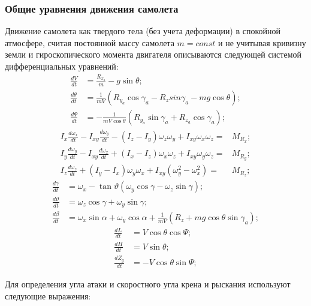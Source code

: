 \documentclass{article}
\begin{document}
\subsubsection{Общие уравнения движения самолета}
Движение самолета как твердого тела (без учета деформации) в спокойной
атмосфере, считая постоянной массу самолета $m=const$ и не учитывая кривизну
земли и гироскопического момента двигателя описываются следующей системой
дифференциальных уравнений:
\begin{align*}
    \frac{dV}{dt}      & = \frac{R_{x_a}}{m} - g \sin{\theta};
    \\
    \frac{d\theta}{dt} & = \frac{1}{mV}(R_{y_a} \cos{\gamma_a} - R_{z}
    sin{\gamma_a} - mg \cos{\theta}); \\
    \frac{d\Psi}{dt}   & = -\frac{1}{mV \cos{\theta}} (R_{y_a} \sin{\gamma_a} +
    R_{z_a} \cos{\gamma_a});
\end{align*}
\begin{align*}
    I_x \frac{d\omega_x}{dt} - I_{xy} \frac{d\omega_y}{dt} - (I_z - I_y)
    \omega_z \omega_y + I_{xy} \omega_x \omega_z = & M_{R_x}; \\
    I_y \frac{d\omega_y}{dt} - I_{xy} \frac{d\omega_x}{dt} + (I_x - I_z)
    \omega_x \omega_z + I_{xy} \omega_y \omega_z = & M_{R_y}; \\
    I_z \frac{d\omega_z}{dt} + (I_y - I_x) \omega_y \omega_x +
    I_{xy}(\omega_y^2 - \omega_x^2) =                        & M_{R_z};
\end{align*}
\begin{align*}
    \frac{d\gamma}{dt}    & = \omega_x - \tan{\vartheta}(\omega_y \cos{\gamma}
    - \omega_z \sin{\gamma});                          \\
    \frac{d\vartheta}{dt} & = \omega_z \cos{\gamma} + \omega_y \sin{\gamma};
    \\
    \frac{d\beta}{dt}     & = \omega_x \sin{\alpha} + \omega_y \cos{\alpha} +
    \frac{1}{mV}(R_z + mg \cos{\theta} \sin{\gamma_a});
\end{align*}
\begin{align*}
    \frac{dL}{dt}   & = V\cos{\theta} \cos{\Psi};    \\
    \frac{dH}{dt}   & = V\sin{\theta};               \\
    \frac{dZ_g}{dt} & = - V \cos{\theta} \sin{\Psi};
\end{align*}

Для определения угла атаки и скоростного угла крена и рыскания используют
следующие выражения:
\end{document}
